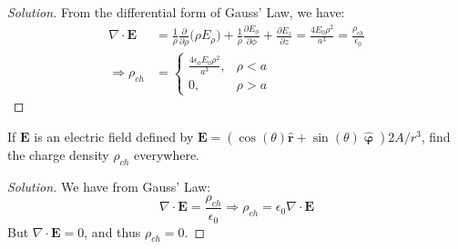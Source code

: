 \documentclass[crop=false,class=article,oneside]{standalone}
\begin{document}
        \begin{proof}[Solution]
            From the differential form of Gauss' Law, we have:
            \begin{align*}
                \nabla\cdot\mathbf{E}
                &=\frac{1}{\rho}\frac{\partial}{\partial\rho}
                \big(\rho{E}_{\rho}\big)
                +\frac{1}{\rho}
                \frac{\partial{E_{\phi}}}{\partial\phi}
                +\frac{\partial{E_{z}}}{\partial{z}}
                =\frac{4E_{0}\rho^{2}}{a^{3}}
                =\frac{\rho_{ch}}{\epsilon_{0}}\\
                \Rightarrow\rho_{ch}
                &=
                \begin{cases}
                    \frac{4\epsilon_{0}E_{0}\rho^{2}}{a^{3}},
                    &\rho<a\\
                    0,
                    &\rho>a
                \end{cases}
            \end{align*}
        \end{proof}
        \begin{problem}[Wangsness 4-12]
            If $\mathbf{E}$ is an electric field defined by
            $\mathbf{E}%
             =(\cos(\theta)\hat{\mathbf{r}}%
             +\sin(\theta)\hat{\boldsymbol{\upvarphi}})2A/r^{3}$,
            find the charge density $\rho_{ch}$ everywhere.
        \end{problem}
        \begin{proof}[Solution]
            We have from Gauss' Law:
            \begin{equation*}
                \nabla\cdot\mathbf{E}=\frac{\rho_{ch}}{\epsilon_{0}}
                \Rightarrow\rho_{ch}=\epsilon_{0}\nabla\cdot\mathbf{E}
            \end{equation*}
            But $\nabla\cdot\mathbf{E}=0$, and thus $\rho_{ch}=0$.
        \end{proof}
\end{document}
